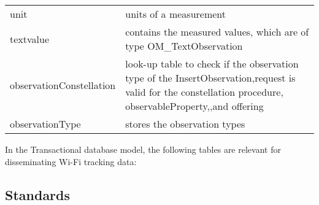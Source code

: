 \begin{table}[]
\begin{tabular}{@{}ll@{}}
unit                       & units of a measurement                                                                                                                                     \\
textvalue                  & contains the measured values, which are of type OM\_TextObservation                                                                                        \\
observationConstellation   & look-up table to check if the observation type of the InsertObservation,request is valid for the constellation procedure, observableProperty,,and offering \\
observationType            & stores the observation types                                                                                                                               \\ \bottomrule
\end{tabular}
\end{table}

In the Transactional database model, the following tables are relevant for disseminating
Wi-Fi tracking data:


\subsection{Standards}

